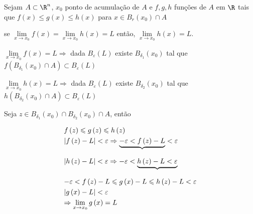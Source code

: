 \documentclass{book}
\begin{document}
\begin{teo}[do confronto]
    Sejam $A \subset \R^n$, $x_0$ ponto de acumula\c c\~ao de $A$ e $f,g,h$ fun\c c\~oes de $A$ em $\R$ tais que $f\left( x \right) \leqslant g\left( x \right) \leqslant h\left( x \right)$ para $x \in B_r \left( {x_0 } \right) \cap A$

    se $\mathop {\lim }\limits_{x \to x_0 } f\left( x \right) = \mathop {\lim }\limits_{x \to x_0 } h\left( x \right) = L$ ent\~ao, $\mathop {\lim }\limits_{x \to x_0 } h\left( x \right) = L$.
\end{teo}

\begin{dem}
    $\mathop {\lim }\limits_{x \to x_0 } f\left( x \right) = L \Rightarrow$ dada $B_\varepsilon  \left( L \right)$ existe $B_{\delta _1 } \left( {x_0 } \right)$ tal que $f\left( {B_{\delta _1 } \left( {x_0 } \right) \cap A} \right) \subset B_\varepsilon  \left( L \right)$

    $\mathop {\lim }\limits_{x \to x_0 } h\left( x \right) = L \Rightarrow$ dada $B_\varepsilon  \left( L \right)$ existe $B_{\delta _2 } \left( {x_0 } \right)$ tal que $h\left( {B_{\delta _2 } \left( {x_0 } \right) \cap A} \right) \subset B_\varepsilon  \left( L \right)$

    Seja $z \in B_{\delta _1 } \left( {x_0 } \right) \cap B_{\delta _2 } \left( {x_0 } \right) \cap A$, ent\~ao

\[
\begin{gathered}
      f\left( z \right) \leqslant g\left( z \right) \leqslant h\left( z \right) \hfill \\
      \left| {f\left( z \right) - L} \right| < \varepsilon  \Rightarrow \underbrace { - \varepsilon  < f\left( z \right) - L}_{} < \varepsilon  \hfill \\
      \left| {h\left( z \right) - L} \right| < \varepsilon  \Rightarrow  - \varepsilon  < \underbrace {h\left( z \right) - L < \varepsilon }_{} \hfill \\
       - \varepsilon  < f\left( z \right) - L \leqslant g\left( x \right) - L \leqslant h\left( z \right) - L < \varepsilon  \hfill \\
\left| {g\left( x \right) - L} \right| < \varepsilon  \hfill \\
       \Rightarrow \mathop {\lim }\limits_{x \to x_0 } g\left( x \right) = L \hfill \\
\end{gathered}
\]

\end{dem}
\end{document}
